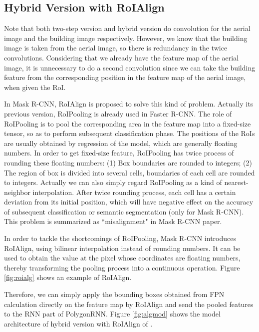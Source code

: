 \subsection{Hybrid Version with RoIAlign}\label{algmod}
Note that both two-step version and hybrid version do convolution for the aerial image and the building image respectively. However, we know that the building image is taken from the aerial image, so there is redundancy in the twice convolutions. Considering that we already have the feature map of the aerial image, it is unnecessary to do a second convolution since we can take the building feature from the corresponding position in the feature map of the aerial image, when given the RoI.

In Mask R-CNN, RoIAlign \cite{maskrcnn} is proposed to solve this kind of problem. Actually its previous version, RoIPooling \cite{fasterrcnn} is already used in Faster R-CNN. The role of RoIPooling is to pool the corresponding area in the feature map into a fixed-size tensor, so as to perform subsequent classification phase. The positions of the RoIs are usually obtained by regression of the model, which are generally floating numbers. In order to get fixed-size feature, RoIPooling has twice process of rounding these floating numbers: (1) Box boundaries are rounded to integers; (2) The region of box is divided into several cells, boundaries of each cell are rounded to integers. Actually we can also simply regard RoIPooling as a kind of nearest-neighbor interpolation. After twice rounding process, each cell has a certain deviation from its initial position, which will have negative effect on the accuracy of subsequent classification or semantic segmentation (only for Mask R-CNN). This problem is summarized as ``misalignment" in Mask R-CNN paper.



In order to tackle the shortcomings of RoIPooling, Mask R-CNN introduces RoIAlign, using bilinear interpolation instead of rounding numbers. It can be used to obtain the value at the pixel whose coordinates are floating numbers, thereby transforming the pooling process into a continuous operation. Figure \ref{fig:roialg} shows an example of RoIAlign.


Therefore, we can simply apply the bounding boxes obtained from FPN calculation directly on the feature map by RoIAlign and send the pooled features to the RNN part of PolygonRNN. Figure \ref{fig:algmod} shows the model architecture of hybrid version with RoIAlign of \modelnameshort.

